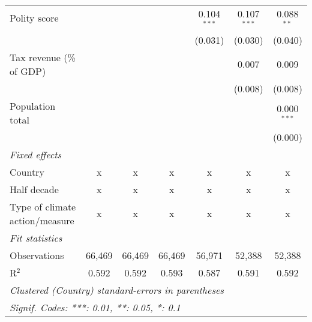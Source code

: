 \begin{tabular}{lcccccc}
   Polity score                                                 &         &                &                & 0.104$^{***}$  & 0.107$^{***}$  & 0.088$^{**}$\\   
                                                                &         &                &                & (0.031)        & (0.030)        & (0.040)\\   
   Tax revenue (\% of GDP)                                      &         &                &                &                & 0.007          & 0.009\\   
                                                                &         &                &                &                & (0.008)        & (0.008)\\   
   Population total                                             &         &                &                &                &                & 0.000$^{***}$\\   
                                                                &         &                &                &                &                & (0.000)\\   
   \emph{Fixed effects}\\
   Country                                                      & x       & x              & x              & x              & x              & x\\  
   Half decade                                                  & x       & x              & x              & x              & x              & x\\  
   Type of climate action/measure                               & x       & x              & x              & x              & x              & x\\  
   \midrule \emph{Fit statistics}\\
   Observations                                                 & 66,469  & 66,469         & 66,469         & 56,971         & 52,388         & 52,388\\  
   R$^2$                                                        & 0.592   & 0.592          & 0.593          & 0.587          & 0.591          & 0.592\\  
   \midrule
   \multicolumn{7}{l}{\emph{Clustered (Country) standard-errors in parentheses}}\\
   \multicolumn{7}{l}{\emph{Signif. Codes: ***: 0.01, **: 0.05, *: 0.1}}\\
\end{tabular}
\par\endgroup


